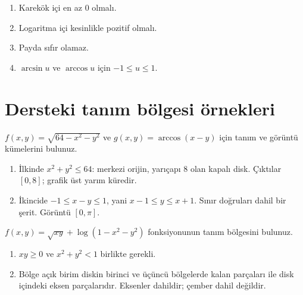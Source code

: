 \begin{enumerate}
\item Karekök içi en az 0 olmalı.
\item Logaritma içi kesinlikle pozitif olmalı.
\item Payda sıfır olamaz.
\item \(\arcsin u\) ve \(\arccos u\) için \(-1\le u\le1\).
\end{enumerate}
\section{Dersteki tanım bölgesi örnekleri}
\begin{tcolorbox}[title={Örnek 4.1 | Disk ve eğik şerit},colframe=accent]\(f(x,y)=\sqrt{64-x^2-y^2}\) ve \(g(x,y)=\arccos(x-y)\) için tanım ve görüntü kümelerini bulunuz.
\par{}\end{tcolorbox}
\begin{tcolorbox}[title={Adım adım çözüm},colback=green!3!white,colframe=green]\begin{enumerate}
\item İlkinde \(x^2+y^2\le64\): merkezi orijin, yarıçapı 8 olan kapalı disk. Çıktılar \([0,8]\); grafik üst yarım küredir.
\item İkincide \(-1\le x-y\le1\), yani \(x-1\le y\le x+1\). Sınır doğruları dahil bir şerit. Görüntü \([0,\pi]\).
\end{enumerate}\end{tcolorbox}
\begin{tcolorbox}[title={Örnek 4.2 | Kök ve logaritmayı birlikte ele almak},colframe=accent]\(f(x,y)=\sqrt{xy}+\log(1-x^2-y^2)\) fonksiyonunun tanım bölgesini bulunuz.
\par{}\end{tcolorbox}
\begin{tcolorbox}[title={Adım adım çözüm},colback=green!3!white,colframe=green]\begin{enumerate}
\item \(xy\ge0\) ve \(x^2+y^2<1\) birlikte gerekli.
\item Bölge açık birim diskin birinci ve üçüncü bölgelerde kalan parçaları ile disk içindeki eksen parçalarıdır. Eksenler dahildir; çember dahil değildir.
\end{enumerate}\end{tcolorbox}
